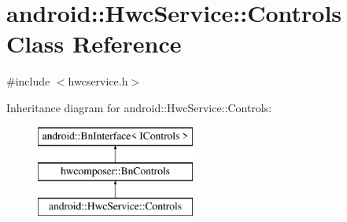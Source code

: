 \hypertarget{classandroid_1_1HwcService_1_1Controls}{}\section{android\+:\+:Hwc\+Service\+:\+:Controls Class Reference}
\label{classandroid_1_1HwcService_1_1Controls}


{\ttfamily \#include $<$hwcservice.\+h$>$}

Inheritance diagram for android\+:\+:Hwc\+Service\+:\+:Controls\+:\begin{figure}[H]
\begin{center}
\leavevmode
\includegraphics[height=3.000000cm]{classandroid_1_1HwcService_1_1Controls}
\end{center}
\end{figure}
